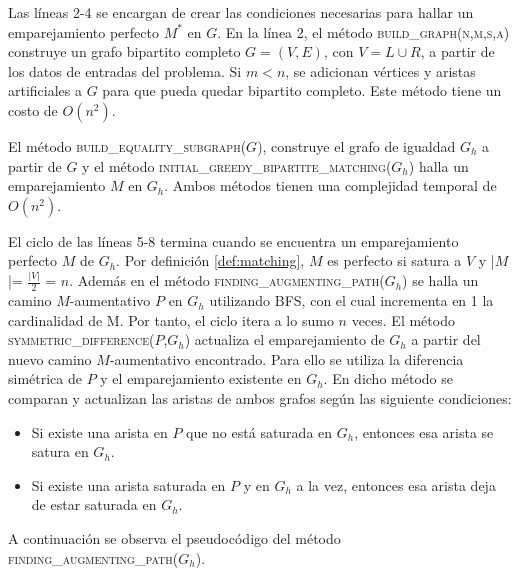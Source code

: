\documentclass[10pt]{article} %
\begin{document}
Las l\'ineas 2-4 se encargan de crear las condiciones necesarias para hallar un emparejamiento perfecto $M^*$ en $G$. En la l\'inea 2, el m\'etodo \textsc{build\_graph(n,m,s,a)} construye un grafo bipartito completo $G = (V,E)$, con $V = L \cup R$, a partir de los datos de entradas del problema. Si $m<n$, se adicionan v\'ertices y aristas artificiales a $G$ para que pueda quedar bipartito completo. Este m\'etodo tiene un costo de $O(n^2)$. 

El m\'etodo \textsc{build\_equality\_subgraph($G$}), construye el grafo de igualdad $G_h$ a partir de $G$ y el m\'etodo \textsc{ initial\_greedy\_bipartite\_matching($G_h$)} halla un emparejamiento $M$ en $G_h$. Ambos m\'etodos tienen una complejidad temporal de $O(n^2)$.

El ciclo de las l\'ineas 5-8 termina cuando se encuentra un emparejamiento perfecto $M$ de $G_h$. Por definici\'on \ref{def:matching}, $M$ es perfecto si satura a $V$ y |$M$|= $\frac{|V|}{2}$ = $n$. Adem\'as en el m\'etodo \textsc{finding\_augmenting\_path($G_h$)} se halla un camino $M$-aumentativo $P$ en $G_h$ utilizando BFS, con el cual incrementa en 1 la cardinalidad de M. Por tanto, el ciclo itera a lo sumo $n$ veces. El m\'etodo \textsc{symmetric\_difference($P$,$G_h$)} actualiza el emparejamiento de $G_h$ a partir del nuevo camino $M$-aumentativo encontrado. Para ello se utiliza la diferencia sim\'etrica de $P$ y el emparejamiento existente en $G_h$. En dicho m\'etodo se comparan y actualizan las aristas de ambos grafos seg\'un las siguiente condiciones:
\begin{itemize}
	\item  Si existe una arista en $P$ que no est\'a saturada en $G_h$, entonces esa arista se satura en $G_h$.
	\item Si existe una arista saturada en $P$ y en $G_h$ a la vez, entonces esa arista deja de estar saturada en $G_h$.
\end{itemize}

A continuaci\'on se observa el pseudoc\'odigo del m\'etodo \textsc{finding\_augmenting\_path($G_h$)}. 
\end{document}
